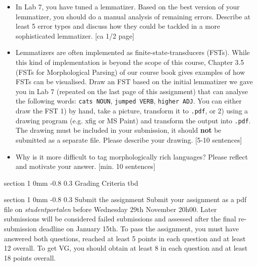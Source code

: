 \documentclass[11pt]{article}
\makeatletter
\renewcommand{\section}{\@startsection
{section}%
{1}%
{0mm}%
{-0.8\baselineskip}%
{0.3\baselineskip}%
{\bfseries\large}}%
\makeatother
\begin{document}
\begin{itemize}
\item In Lab 7, you have tuned a lemmatizer. Based on the best version
  of your lemmatizer, you should do a manual analysis of remaining
  errors. Describe at least 5 error types and discuss how they could
  be tackled in a more sophisticated lemmatizer. \textcolor{UUred}{[ca
    1/2 page]}
\item Lemmatizers are often implemented as finite-state-transducers
  (FSTs). While this kind of implementation is beyond the scope of
  this course, Chapter 3.5 (FSTs for Morphological Parsing) of our
  course book gives examples of how FSTs can be visualised. Draw an
  FST based on the initial lemmatizer we gave you in Lab 7 (repeated
  on the last page of this assignment) that can analyse the following
  words: \texttt{cats NOUN}, \texttt{jumped VERB}, \texttt{higher
    ADJ}. You can either draw the FST 1) by hand, take a picture,
  transform it to \texttt{.pdf}, or 2) using a drawing program
  (e.g. xfig or MS Paint) and transform the output into
  \texttt{.pdf}. The drawing must be included in your submission, it
  should \textbf{not} be submitted as a separate file. Please describe
  your drawing. \textcolor{UUred}{[5-10 sentences]}
\item Why is it more difficult to tag morphologically rich languages?
  Please reflect and motivate your answer. \textcolor{UUred}{[min. 10
    sentences]}
\end{itemize}

\section{Grading Criteria}
tbd

\section{Submit the assignment}
\noindent
Submit your assignment as a pdf file on \textit{studentportalen}
before Wednesday 29th November 20h00. Later submissions will be
considered failed submissions and assessed after the final
re-submission deadline on January 15th. To pass the assignment, you
must have answered both questions, reached at least 5 points in each
question and at least 12 overall.  To get VG, you should obtain at
least 8 in each question and at least 18 points overall.
  
\end{document}
